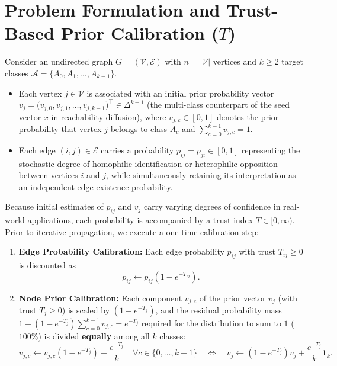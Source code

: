 \documentclass[11pt, a4paper]{article}
\theoremstyle{definition}
\theoremstyle{definition}
\begin{document}
\section{Problem Formulation and Trust-Based Prior Calibration (\texorpdfstring{$T$}{T})}

Consider an undirected graph $G = (\mathcal{V}, \mathcal{E})$ with $n = |\mathcal{V}|$ vertices and $k \ge 2$ target classes $\mathcal{A} = \{A_0, A_1, \dots, A_{k-1}\}$.
\begin{itemize}
\item Each vertex $j \in \mathcal{V}$ is associated with an initial prior probability vector $v_j = \big(v_{j,0}, v_{j,1}, \dots, v_{j,k-1}\big)^\top \in \Delta^{k-1}$ (the multi-class counterpart of the seed vector $x$ in reachability diffusion), where $v_{j,c} \in [0,1]$ denotes the prior probability that vertex $j$ belongs to class $A_c$ and $\sum_{c=0}^{k-1} v_{j,c} = 1$.
\item Each edge $(i, j) \in \mathcal{E}$ carries a probability $p_{ij} = p_{ji} \in [0, 1]$ representing the stochastic degree of homophilic identification or heterophilic opposition between vertices $i$ and $j$, while simultaneously retaining its interpretation as an independent edge-existence probability.
\end{itemize}

Because initial estimates of $p_{ij}$ and $v_j$ carry varying degrees of confidence in real-world applications, each probability is accompanied by a trust index $T \in [0, \infty)$. Prior to iterative propagation, we execute a one-time calibration step:
\begin{enumerate}[label=\textbf{\arabic*.}]
\item \textbf{Edge Probability Calibration:} Each edge probability $p_{ij}$ with trust $T_{ij} \ge 0$ is discounted as
\begin{equation}\label{eq:edge_trust_en}
p_{ij} \leftarrow p_{ij}\left(1 - e^{-T_{ij}}\right).
\end{equation}
\item \textbf{Node Prior Calibration:} Each component $v_{j,c}$ of the prior vector $v_j$ (with trust $T_j \ge 0$) is scaled by $\left(1 - e^{-T_j}\right)$, and the residual probability mass $1 - \left(1 - e^{-T_j}\right)\sum_{c=0}^{k-1} v_{j,c} = e^{-T_j}$ required for the distribution to sum to $1$ ($100\%$) is divided \textbf{equally} among all $k$ classes:
\begin{equation}\label{eq:prior_trust_en}
v_{j,c} \leftarrow v_{j,c}\left(1 - e^{-T_j}\right) + \frac{e^{-T_j}}{k} \quad \forall c \in \{0, \dots, k-1\} \quad \Longleftrightarrow \quad v_j \leftarrow \left(1 - e^{-T_j}\right)v_j + \frac{e^{-T_j}}{k}\mathbf{1}_k.
\end{equation}
\end{enumerate}
\end{document}
